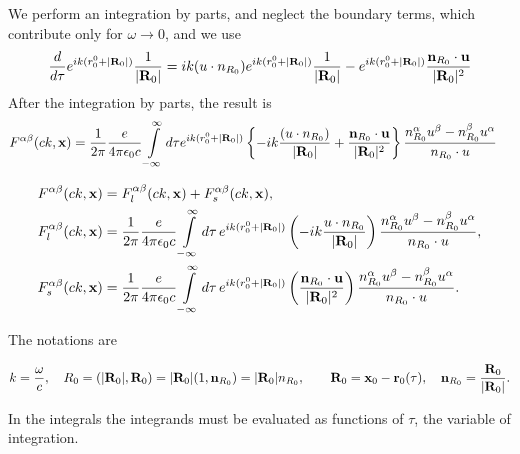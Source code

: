 We perform an integration by parts, and neglect the boundary terms, which contribute only for $\omega\rightarrow0$, and we use
\begin{align}
  \frac{d}{d\tau}e^{i k (r_0^0+|{\bf R}_0|)}\frac1{|{\bf R}_0|} = i k (u\cdot n_{R_0}) e^{i k (r_0^0+|{\bf R}_0|)}\frac1{|{\bf R}_0|} - e^{i k (r_0^0+|{\bf R}_0|)}\frac{{\bf n}_{R_0}\cdot {\bf u}}{|{\bf R}_0|^2}
\end{align}
After the integration by parts, the result is
\begin{align}
  F^{\alpha\beta}(c k, {\bf x}) &= \frac1{2\pi}\frac{e}{4\pi\epsilon_0c}\int\limits_{-\infty}^{\infty} d\tau e^{i k (r_0^0+|{\bf R}_0|)}\left\{ -ik \frac{  (u\cdot n_{R_0})}{|{\bf R}_0|}+\frac{{\bf n}_{R_0}\cdot{\bf u}}{|{\bf R}_0|^2}\right\} \frac{n_{R_0}^{\alpha}u^{\beta}-n_{R_0}^{\beta}u^{\alpha}}{n_{R_0}\cdot u}
\end{align}

\begin{highlightbox}
  \begin{align}
    F^{\alpha\beta}(c k,{\bf x}) &= F^{\alpha\beta}_{l}(c k,{\bf x}) + F^{\alpha\beta}_{s}(c k,{\bf x}),
    \\
    F^{\alpha\beta}_{l}(c k,{\bf x}) &=
    \frac1{2\pi}\frac{e}{4\pi\epsilon_0c}\int\limits_{-\infty}^{\infty} d\tau\,
    e^{i k (r_0^0+|{\bf R}_0|)}
    \left(
      -ik \frac{u\cdot n_{R_0}}{|{\bf R}_0|}
    \right)
    \frac{n_{R_0}^{\alpha}u^{\beta}-n_{R_0}^{\beta}u^{\alpha}}{n_{R_0}\cdot u},
    \\
    F^{\alpha\beta}_{s}(c k,{\bf x}) &=
    \frac1{2\pi}\frac{e}{4\pi\epsilon_0c}\int\limits_{-\infty}^{\infty} d\tau\,
    e^{i k (r_0^0+|{\bf R}_0|)}
    \left(
      \frac{{\bf n}_{R_0}\cdot{\bf u}}{|{\bf R}_0|^2}
    \right)
    \frac{n_{R_0}^{\alpha}u^{\beta}-n_{R_0}^{\beta}u^{\alpha}}{n_{R_0}\cdot u}.
  \end{align}
\end{highlightbox}
The notations are
\begin{highlightbox}
  \begin{align}
    k = \frac{\omega}{c},\quad
    R_0 = (|{\bf R}_0|,{\bf R}_0)=|{\bf R}_0| (1,{\bf n}_{R_0}) = |{\bf R}_0|n_{R_0}, \qquad {\bf R}_0 = {\bf x}_0-{\bf r}_0(\tau),\quad {\bf n}_{R_0} = \frac{{\bf R}_0}{|{\bf R}_0|}.
  \end{align}
\end{highlightbox}
In the integrals the integrands must be evaluated as functions of $\tau$, the variable of integration.
